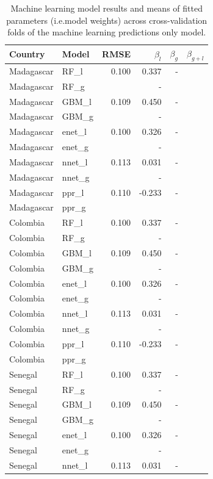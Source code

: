 \documentclass[11pt]{article}
\begin{document}
\begin{table}
\caption{Machine learning model results and means of fitted parameters (i.e.\thinspace model weights) across cross-validation folds of the machine learning predictions only model. }
\centering
\small
\begin{tabular}{ll|rrrr}
     Country          & Model &      RMSE & $\beta_l $ &   $\beta_g$   &  $\beta_{g+l}$                                 \\ \hline
Madagascar & RF_l & 0.100 & 0.337 &-&\\
Madagascar & RF_g &  & - &&\\
Madagascar & GBM_l & 0.109 & 0.450 & - &\\
Madagascar & GBM_g &  & - &&\\
Madagascar & enet_l & 0.100 & 0.326 &-&\\
Madagascar & enet_g &  & - &&\\
Madagascar & nnet_l & 0.113 & 0.031 &-&\\
Madagascar & nnet_g &  & - &&\\
Madagascar & ppr_l & 0.110 & -0.233 &-&\\
Madagascar & ppr_g &  &  &&\vspace{0.3cm}\\ 
Colombia & RF_l & 0.100 & 0.337 &-&\\
Colombia & RF_g &  & - &&\\
Colombia & GBM_l & 0.109 & 0.450 & - &\\
Colombia & GBM_g &  & - &&\\
Colombia & enet_l & 0.100 & 0.326 &-&\\
Colombia & enet_g &  & - &&\\
Colombia & nnet_l & 0.113 & 0.031 &-&\\
Colombia & nnet_g &  & - &&\\
Colombia & ppr_l & 0.110 & -0.233 &-&\\
Colombia & ppr_g &  &  &&\vspace{0.3cm}\\ 
Senegal & RF_l & 0.100 & 0.337 &-&\\
Senegal & RF_g &  & - &&\\
Senegal & GBM_l & 0.109 & 0.450 & - &\\
Senegal & GBM_g &  & - &&\\
Senegal & enet_l & 0.100 & 0.326 &-&\\
Senegal & enet_g &  & - &&\\
Senegal & nnet_l & 0.113 & 0.031 &-&\\

\end{tabular}
\end{table}
\end{document}
